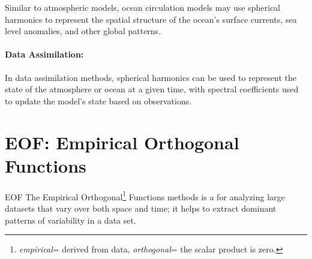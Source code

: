 Similar to atmospheric models, ocean circulation models may use spherical harmonics to represent the spatial structure of the ocean's surface currents, sea level anomalies, and other global patterns.

\paragraph{\textbf{Data Assimilation}:}

In data assimilation methods, spherical harmonics can be used to represent the state of the atmosphere or ocean at a given time, with spectral coefficients used to update the model's state based on observations.


\section{EOF: Empirical Orthogonal Functions}\label{sec:EOF}

\begin{defn}{EOF}
	{
		The Empirical Orthogonal\footnote{\textit{empirical}= derived from data, \textit{orthogonal}= the scalar product is zero.}
		Functions methods is a for analyzing large datasets that vary over both space and time; it helps to extract dominant patterns of variability in a data set.
	}
\end{defn}

